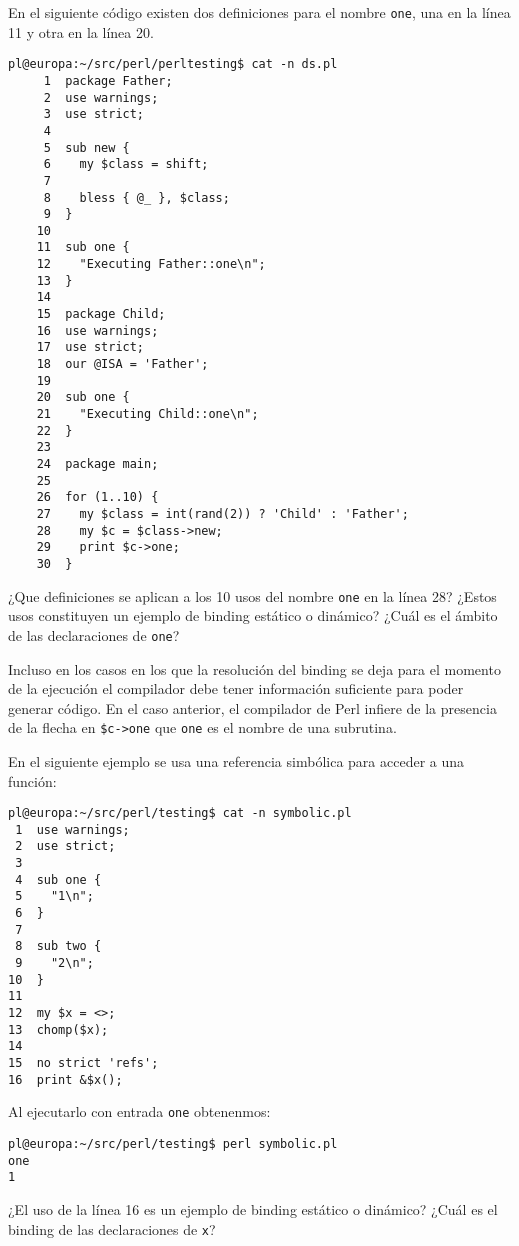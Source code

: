 \begin{exercise}
En el siguiente código existen dos definiciones para 
el nombre \verb|one|, una en la línea 11 y otra en la
línea 20.

\begin{verbatim}
pl@europa:~/src/perl/perltesting$ cat -n ds.pl
     1  package Father;
     2  use warnings;
     3  use strict;
     4
     5  sub new {
     6    my $class = shift;
     7
     8    bless { @_ }, $class;
     9  }
    10
    11  sub one {
    12    "Executing Father::one\n";
    13  }
    14
    15  package Child;
    16  use warnings;
    17  use strict;
    18  our @ISA = 'Father';
    19
    20  sub one {
    21    "Executing Child::one\n";
    22  }
    23
    24  package main;
    25
    26  for (1..10) {
    27    my $class = int(rand(2)) ? 'Child' : 'Father';
    28    my $c = $class->new;
    29    print $c->one;
    30  }
\end{verbatim}
¿Que definiciones se aplican a los 10 usos del nombre \verb|one|
en la línea 28? 
¿Estos usos constituyen un ejemplo de binding estático
o dinámico?
¿Cuál es el ámbito de las declaraciones de \verb|one|?
\end{exercise}

Incluso en los casos en los que la resolución del binding se deja para el momento de la ejecución
el compilador debe tener información suficiente para poder generar código. En el caso
anterior, el compilador de Perl infiere de la presencia de la flecha en \verb|$c->one| 
que \verb|one| es el nombre de una subrutina. 

\begin{exercise}
En el siguiente ejemplo se usa una referencia simbólica para
acceder a una función:
\begin{verbatim}
pl@europa:~/src/perl/testing$ cat -n symbolic.pl
 1  use warnings;
 2  use strict;
 3
 4  sub one {
 5    "1\n";
 6  }
 7
 8  sub two {
 9    "2\n";
10  }
11
12  my $x = <>;
13  chomp($x);
14
15  no strict 'refs';
16  print &$x();
\end{verbatim}
Al ejecutarlo con entrada \verb|one| obtenenmos:
\begin{verbatim}
pl@europa:~/src/perl/testing$ perl symbolic.pl
one
1

\end{verbatim}
¿El uso de la línea 16 es un ejemplo de binding estático o dinámico?
¿Cuál es el binding de las declaraciones de \verb|x|?
\end{exercise}

